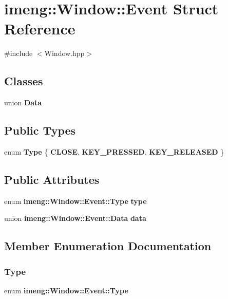 \section{imeng\+::Window\+::Event Struct Reference}
\label{structimeng_1_1_window_1_1_event}


{\ttfamily \#include $<$Window.\+hpp$>$}

\subsection*{Classes}
\begin{DoxyCompactItemize}
\item 
union \textbf{ Data}
\end{DoxyCompactItemize}
\subsection*{Public Types}
\begin{DoxyCompactItemize}
\item 
enum \textbf{ Type} \{ \textbf{ C\+L\+O\+SE}, 
\textbf{ K\+E\+Y\+\_\+\+P\+R\+E\+S\+S\+ED}, 
\textbf{ K\+E\+Y\+\_\+\+R\+E\+L\+E\+A\+S\+ED}
 \}
\end{DoxyCompactItemize}
\subsection*{Public Attributes}
\begin{DoxyCompactItemize}
\item 
enum \textbf{ imeng\+::\+Window\+::\+Event\+::\+Type} \textbf{ type}
\item 
union \textbf{ imeng\+::\+Window\+::\+Event\+::\+Data} \textbf{ data}
\end{DoxyCompactItemize}


\subsection{Member Enumeration Documentation}
\mbox{\label{structimeng_1_1_window_1_1_event_a7a3a58743dbbc2ed70e7307bd158ffad}} 
\subsubsection{Type}
{\footnotesize\ttfamily enum \textbf{ imeng\+::\+Window\+::\+Event\+::\+Type}}

